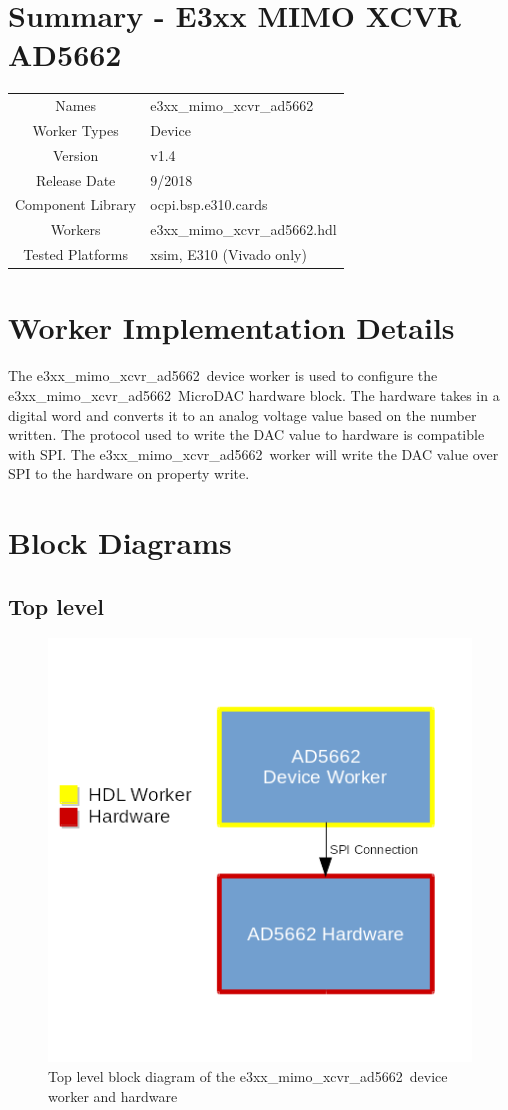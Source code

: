 \documentclass{article}
\author{} %
\date{Version \docVersion} %
\title{\docTitle}
\def\docVersion{1.4}
\def\comp{e3xx\_mimo\_xcvr\_ad5662}
\def\Comp{E3xx MIMO XCVR AD5662}
\def\comp{e3xx\_mimo\_xcvr\_ad5662}
\def\Comp{E3xx MIMO XCVR AD5662}
\begin{document}
\section*{Summary - \Comp}
\begin{tabular}{|c|M{13.5cm}|}
	\hline
	                  &                                      \\
	\hline
	Names              & \comp                        \\
	\hline
	Worker Types       & Device \\
	\hline
	Version           & v\docVersion \\
	\hline
	Release Date      & 9/2018 \\
	\hline
	Component Library & ocpi.bsp.e310.cards \\
	\hline
	Workers           & \comp.hdl                \\
	\hline
	Tested Platforms  & xsim, E310 (Vivado only)                       \\
	\hline
\end{tabular}

\section*{Worker Implementation Details}
The \comp\ device worker is used to configure the \comp\ MicroDAC hardware block. The hardware takes in a digital word and converts it to an analog voltage value based on the number written. The protocol used to write the DAC value to hardware is compatible with SPI. The \comp\ worker will write the DAC value over SPI to the hardware on property write.
\section*{Block Diagrams}
\subsection*{Top level}
\begin{figure}[ht]
	\centerline{\includegraphics[scale=0.75]{top_level_diagram}}
	\caption{Top level block diagram of the \comp\ device worker and hardware}
	\label{fig:tb}
\end{figure}
\flushleft
\end{document}
